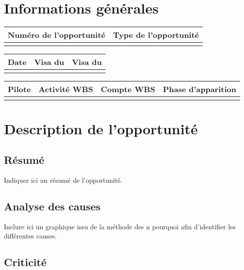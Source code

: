 \section*{Informations générales}
 
\begin{table}[H]
\centering
	\begin{tabularx}{16.8cm}{|X|X|}
	\hline
	\rowcolor{gray!40} Numéro de l'opportunité & Type de l'opportunité \\
	\hline
	 &  \\
	\hline
	\end{tabularx}
\end{table}

\begin{table}[H]
\centering
	\begin{tabularx}{16.8cm}{|X|X|X|}
	\hline
	\rowcolor{gray!40} Date & Visa du \RQ & Visa du \CP \\
	\hline
	  & & \\
	\hline
	\end{tabularx}
\end{table}

\begin{table}[H]
\centering
	\begin{tabularx}{16.8cm}{|X|X|X|X|}
	\hline
	\rowcolor{gray!40} Pilote & Activité WBS & Compte WBS & Phase d'apparition \\
	\hline
	  & & &\\
	\hline
	\end{tabularx}
\end{table}

\section*{Description de l'opportunité}

\subsection*{Résumé}
	Indiquer ici un résumé de l'opportunité.
	
\subsection*{Analyse des causes}
	Inclure ici un graphique issu de la méthode des n pourquoi afin d'identifier les différentes causes.

\subsection*{Criticité}

